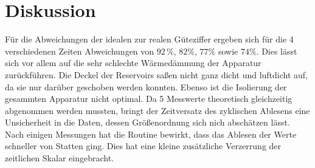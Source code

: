 \section{Diskussion}
\label{sec:Diskussion}
Für die Abweichungen der idealen zur realen Güteziffer ergeben
sich für die 4 verschiedenen Zeiten Abweichungen von $92\,\%$,
$82\%$, $77\%$ sowie $74\%$. Dies lässt sich vor allem auf die sehr 
schlechte Wärmedämmung der Apparatur zurückführen. Die Deckel der
Reservoirs saßen nicht ganz dicht und luftdicht auf, da sie nur darüber 
geschoben werden konnten. Ebenso ist die Isolierung der gesammten Apparatur
nicht optimal. Da 5 Messwerte theoretisch gleichzeitig abgenommen werden mussten,
bringt der Zeitversatz des zyklischen Ablesens eine Unsicherheit in die Daten,
dessen Größenordnung sich nich abschätzen lässt. Nach einigen Messungen hat die 
Routine bewirkt, dass das Ablesen der Werte schneller von Statten ging. Dies hat 
eine kleine zusätzliche Verzerrung der zeitlichen Skalar eingebracht. 
